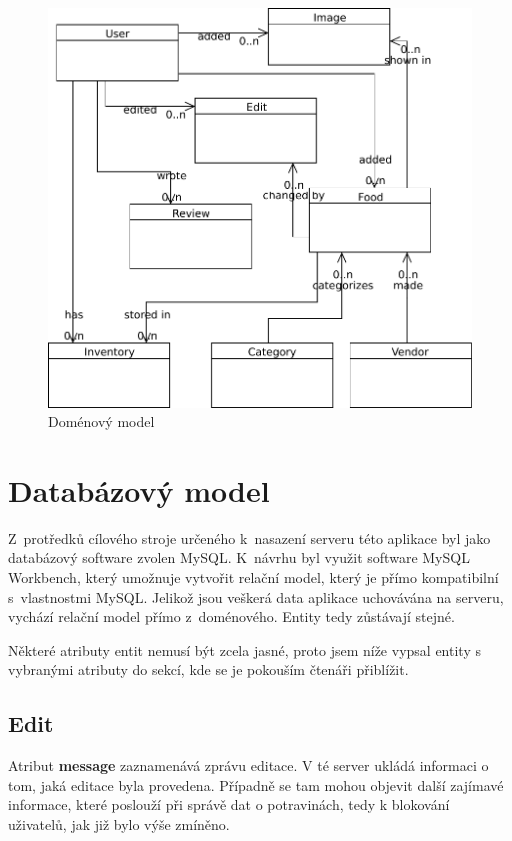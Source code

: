 \documentclass[thesis=B,czech]{FITthesis}[2013/10/20]
\begin{document}
\begin{figure}[H]
  \centering
  \includegraphics[scale=0.75]{diagrams/model}
  \caption{Doménový model}
  \label{fig:DomainModel}
\end{figure}

\section{Databázový model}

Z~protředků cílového stroje určeného k~nasazení serveru této aplikace byl jako databázový software zvolen MySQL. K~návrhu byl využit software MySQL Workbench, který umožnuje vytvořit relační model, který je přímo kompatibilní s~vlastnostmi MySQL. Jelikož jsou veškerá data aplikace uchovávána na serveru, vychází relační model přímo z~doménového. Entity tedy zůstávají stejné.

Některé atributy entit nemusí být zcela jasné, proto jsem níže vypsal entity s vybranými atributy do sekcí, kde se je pokouším čtenáři přiblížit.

\subsection{Edit}

Atribut \textbf{message} zaznamenává zprávu editace. V té server ukládá informaci o tom, jaká editace byla provedena. Případně se tam mohou objevit další zajímavé informace, které poslouží při správě dat o potravinách, tedy k blokování uživatelů, jak již bylo výše zmíněno.
\end{document}
